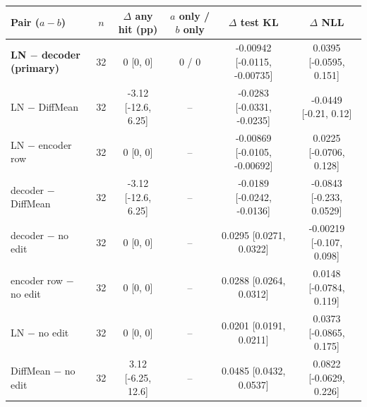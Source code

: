 \begin{tabular}{lccccc}
\toprule
Pair ($a-b$) & $n$ & $\Delta$ any hit (pp) & $a$ only / $b$ only & $\Delta$ test KL & $\Delta$ NLL \\
\midrule
\textbf{LN $-$ decoder (primary)} & 32 & 0 [0, 0] & 0 / 0 & -0.00942 [-0.0115, -0.00735] & 0.0395 [-0.0595, 0.151] \\
LN $-$ DiffMean & 32 & -3.12 [-12.6, 6.25] & -- & -0.0283 [-0.0331, -0.0235] & -0.0449 [-0.21, 0.12] \\
LN $-$ encoder row & 32 & 0 [0, 0] & -- & -0.00869 [-0.0105, -0.00692] & 0.0225 [-0.0706, 0.128] \\
decoder $-$ DiffMean & 32 & -3.12 [-12.6, 6.25] & -- & -0.0189 [-0.0242, -0.0136] & -0.0843 [-0.233, 0.0529] \\
decoder $-$ no edit & 32 & 0 [0, 0] & -- & 0.0295 [0.0271, 0.0322] & -0.00219 [-0.107, 0.098] \\
encoder row $-$ no edit & 32 & 0 [0, 0] & -- & 0.0288 [0.0264, 0.0312] & 0.0148 [-0.0784, 0.119] \\
LN $-$ no edit & 32 & 0 [0, 0] & -- & 0.0201 [0.0191, 0.0211] & 0.0373 [-0.0865, 0.175] \\
DiffMean $-$ no edit & 32 & 3.12 [-6.25, 12.6] & -- & 0.0485 [0.0432, 0.0537] & 0.0822 [-0.0629, 0.226] \\
\bottomrule
\end{tabular}
